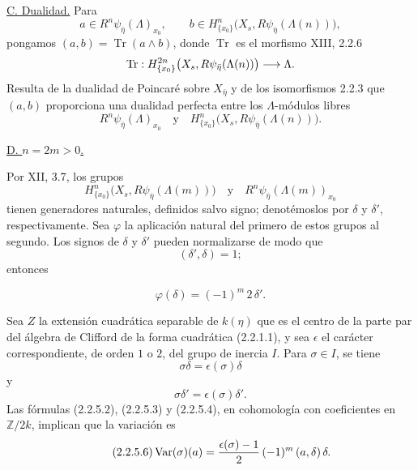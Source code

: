 \medskip
\noindent\underline{C. Dualidad.}
Para
\[
a\in R^n\psi_{\bar\eta}(\Lambda)_{x_0},
\qquad
b\in H^n_{\{x_0\}}\bigl(X_s,R\psi_{\bar\eta}(\Lambda(n))\bigr),
\]
pongamos $(a,b)=\operatorname{Tr}(a\wedge b)$, donde
$\operatorname{Tr}$ es el morfismo XIII, 2.2.6
\[
\operatorname{Tr}:
H^{2n}_{\{x_0\}}\bigl(X_s,R\psi_{\sisi{\eta}{\bar\eta}}(\Lambda(n))\bigr)
\longrightarrow\Lambda.
\]
Resulta de la dualidad de Poincaré sobre $X_{\bar\eta}$ y de los
isomorfismos 2.2.3 que $(a,b)$ proporciona una dualidad perfecta entre
los $\Lambda$-módulos libres
\[
R^n\psi_{\bar\eta}(\Lambda)_{x_0}
\quad\text{y}\quad
H^n_{\{x_0\}}\bigl(X_s,R\psi_{\bar\eta}(\Lambda(n))\bigr).
\]

\medskip
\noindent\underline{D. $n=2m>0$.}

Por XII, 3.7, los grupos
\[
H^n_{\{x_0\}}\bigl(X_s,R\psi_{\bar\eta}(\Lambda(m))\bigr)
\quad\text{y}\quad
R^n\psi_{\bar\eta}(\Lambda(m))_{x_0}
\]
tienen generadores naturales, definidos salvo signo; denotémoslos por
$\delta$ y $\delta'$, respectivamente. Sea $\varphi$ la aplicación natural
del primero de estos grupos al segundo. Los signos de $\delta$ y
$\delta'$ pueden normalizarse de modo que
\begin{equation}\tag{2.2.5.2}
(\delta',\delta)=1;
\end{equation}
entonces

\pageoriginale

\begin{equation}\tag{2.2.5.3}
\varphi(\delta)=(-1)^m\,2\,\delta'.
\end{equation}

Sea $Z$ la extensión cuadrática separable de $k(\eta)$ que es el centro
de la parte par del álgebra de Clifford de la forma cuadrática
(2.2.1.1), y sea $\epsilon$ el carácter correspondiente, de orden $1$
o $2$, del grupo de inercia $I$. Para $\sigma\in I$, se tiene
\begin{equation}\tag{2.2.5.4}
\sigma\delta=\epsilon(\sigma)\delta
\end{equation}
y
\begin{equation}\tag{2.2.5.5}
\sigma\delta'=\epsilon(\sigma)\delta'.
\end{equation}
Las fórmulas (2.2.5.2), (2.2.5.3) y (2.2.5.4), en cohomología con
coeficientes en $\mathbb Z/2k$, implican que la variación es
\begin{equation}\tag{2.2.5.6}
\operatorname{Var}(\sigma)(a)=
\frac{\epsilon(\sigma)-1}{2}\,(-1)^m\,
\sisi{(a\delta)}{(a,\delta)}\,\delta.
\end{equation}

